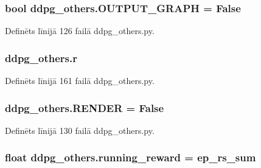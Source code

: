 \subsubsection[{\texorpdfstring{O\+U\+T\+P\+U\+T\+\_\+\+G\+R\+A\+PH}{OUTPUT_GRAPH}}]{\setlength{\rightskip}{0pt plus 5cm}bool ddpg\+\_\+others.\+O\+U\+T\+P\+U\+T\+\_\+\+G\+R\+A\+PH = False}\hypertarget{namespaceddpg__others_a8d8efc66aff50b88de22a9373e2d7602}{}\label{namespaceddpg__others_a8d8efc66aff50b88de22a9373e2d7602}


Definēts līnijā 126 failā ddpg\+\_\+others.\+py.

\subsubsection[{\texorpdfstring{r}{r}}]{\setlength{\rightskip}{0pt plus 5cm}ddpg\+\_\+others.\+r}\hypertarget{namespaceddpg__others_a05079a0e5b9b284648a5e279d844fc34}{}\label{namespaceddpg__others_a05079a0e5b9b284648a5e279d844fc34}


Definēts līnijā 161 failā ddpg\+\_\+others.\+py.

\subsubsection[{\texorpdfstring{R\+E\+N\+D\+ER}{RENDER}}]{\setlength{\rightskip}{0pt plus 5cm}ddpg\+\_\+others.\+R\+E\+N\+D\+ER = False}\hypertarget{namespaceddpg__others_a2c384bab41511c29b415ab1bd8fe9726}{}\label{namespaceddpg__others_a2c384bab41511c29b415ab1bd8fe9726}


Definēts līnijā 130 failā ddpg\+\_\+others.\+py.

\subsubsection[{\texorpdfstring{running\+\_\+reward}{running_reward}}]{\setlength{\rightskip}{0pt plus 5cm}float ddpg\+\_\+others.\+running\+\_\+reward = {\bf ep\+\_\+rs\+\_\+sum}}\hypertarget{namespaceddpg__others_a98714db748bdf3f1566b42ed000f7365}{}\label{namespaceddpg__others_a98714db748bdf3f1566b42ed000f7365}


